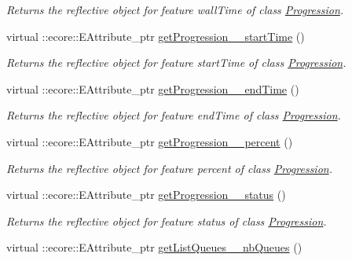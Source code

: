\begin{DoxyCompactItemize}
\begin{DoxyCompactList}\small\item\em Returns the reflective object for feature wallTime of class \hyperlink{classTMS__Data_1_1Progression}{Progression}. \item\end{DoxyCompactList}\item 
virtual ::ecore::EAttribute\_\-ptr \hyperlink{classTMS__Data_1_1TMS__DataPackage_af121126c69a4ab2fc4a5ffd0fd7535d4}{getProgression\_\-\_\-startTime} ()
\begin{DoxyCompactList}\small\item\em Returns the reflective object for feature startTime of class \hyperlink{classTMS__Data_1_1Progression}{Progression}. \item\end{DoxyCompactList}\item 
virtual ::ecore::EAttribute\_\-ptr \hyperlink{classTMS__Data_1_1TMS__DataPackage_a6ef97489397341c18572545508b51162}{getProgression\_\-\_\-endTime} ()
\begin{DoxyCompactList}\small\item\em Returns the reflective object for feature endTime of class \hyperlink{classTMS__Data_1_1Progression}{Progression}. \item\end{DoxyCompactList}\item 
virtual ::ecore::EAttribute\_\-ptr \hyperlink{classTMS__Data_1_1TMS__DataPackage_a613d584a3998371379fb8137a3210499}{getProgression\_\-\_\-percent} ()
\begin{DoxyCompactList}\small\item\em Returns the reflective object for feature percent of class \hyperlink{classTMS__Data_1_1Progression}{Progression}. \item\end{DoxyCompactList}\item 
virtual ::ecore::EAttribute\_\-ptr \hyperlink{classTMS__Data_1_1TMS__DataPackage_a0e9642eedfd5cc926db644f9b5086fd4}{getProgression\_\-\_\-status} ()
\begin{DoxyCompactList}\small\item\em Returns the reflective object for feature status of class \hyperlink{classTMS__Data_1_1Progression}{Progression}. \item\end{DoxyCompactList}\item 
virtual ::ecore::EAttribute\_\-ptr \hyperlink{classTMS__Data_1_1TMS__DataPackage_a64b6535623de2e46220ab07293592f6b}{getListQueues\_\-\_\-nbQueues} ()

\end{DoxyCompactItemize}

